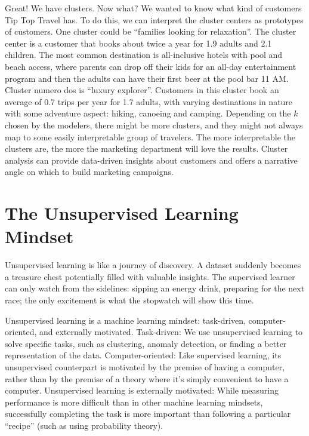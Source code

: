 \documentclass[
  10pt,
]{scrbook}
\begin{document}
Great! We have clusters.
Now what?
We wanted to know what kind of customers Tip Top Travel has.
To do this, we can interpret the cluster centers as prototypes of customers.
One cluster could be ``families looking for relaxation''.
The cluster center is a customer that books about twice a year for 1.9 adults and 2.1 children.
The most common destination is all-inclusive hotels with pool and beach access, where parents can drop off their kids for an all-day entertainment program and then the adults can have their first beer at the pool bar 11 AM.
Cluster numero dos is ``luxury explorer''.
Customers in this cluster book an average of 0.7 trips per year for 1.7 adults, with varying destinations in nature with some adventure aspect: hiking, canoeing and camping.
Depending on the \(k\) chosen by the modelers, there might be more clusters, and they might not always map to some easily interpretable group of travelers.
The more interpretable the clusters are, the more the marketing department will love the results.
Cluster analysis can provide data-driven insights about customers and offers a narrative angle on which to build marketing campaigns.

\hypertarget{the-unsupervised-learning-mindset}{%
\section{The Unsupervised Learning Mindset}\label{the-unsupervised-learning-mindset}}

Unsupervised learning is like a journey of discovery.
A dataset suddenly becomes a treasure chest potentially filled with valuable insights.
The supervised learner can only watch from the sidelines: sipping an energy drink, preparing for the next race; the only excitement is what the stopwatch will show this time.

Unsupervised learning is a machine learning mindset: task-driven, computer-oriented, and externally motivated.
Task-driven: We use unsupervised learning to solve specific tasks, such as clustering, anomaly detection, or finding a better representation of the data.
Computer-oriented: Like supervised learning, its unsupervised counterpart is motivated by the premise of having a computer, rather than by the premise of a theory where it's simply convenient to have a computer.
Unsupervised learning is externally motivated: While measuring performance is more difficult than in other machine learning mindsets, successfully completing the task is more important than following a particular ``recipe'' (such as using probability theory).
\end{document}

